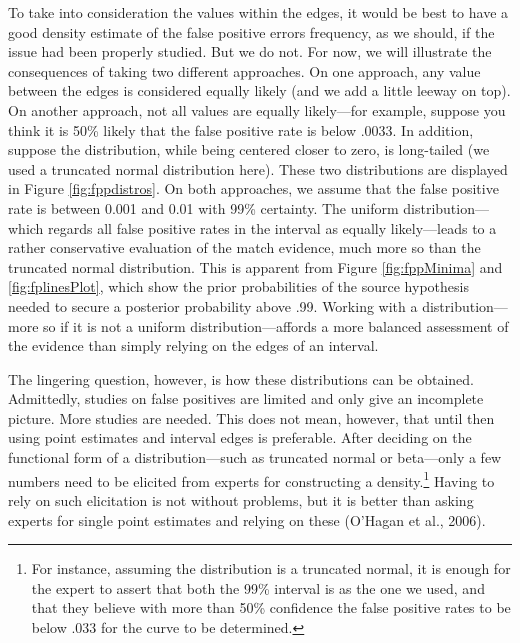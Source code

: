 \documentclass[
  10pt,
  dvipsnames,enabledeprecatedfontcommands]{scrartcl}
\begin{document}
To take into consideration the values within the edges, it would be best
to have a good density estimate of the false positive errors frequency,
as we should, if the issue had been properly studied. But we do not. For
now, we will illustrate the consequences of taking two different
approaches. On one approach, any value between the edges is considered
equally likely (and we add a little leeway on top). On another approach,
not all values are equally likely---for example, suppose you think it is
50\% likely that the false positive rate is below .0033. In addition,
suppose the distribution, while being centered closer to zero, is
long-tailed (we used a truncated normal distribution here). These two
distributions are displayed in Figure \ref{fig:fppdistros}. On both
approaches, we assume that the false positive rate is between 0.001 and
0.01 with 99\% certainty. The uniform distribution---which regards all
false positive rates in the interval as equally likely---leads to a
rather conservative evaluation of the match evidence, much more so than
the truncated normal distribution. This is apparent from Figure
\ref{fig:fppMinima} and \ref{fig:fplinesPlot}, which show the prior
probabilities of the source hypothesis needed to secure a posterior
probability above .99. Working with a distribution---more so if it is
not a uniform distribution---affords a more balanced assessment of the
evidence than simply relying on the edges of an interval.

The lingering question, however, is how these distributions can be
obtained. Admittedly, studies on false positives are limited and only
give an incomplete picture. More studies are needed. This does not mean,
however, that until then using point estimates and interval edges is
preferable. After deciding on the functional form of a
distribution---such as truncated normal or beta---only a few numbers
need to be elicited from experts for constructing a density.\footnote{For
  instance, assuming the distribution is a truncated normal, it is
  enough for the expert to assert that both the 99\% interval is as the
  one we used, and that they believe with more than 50\% confidence the
  false positive rates to be below \(.033\) for the curve to be
  determined.} Having to rely on such elicitation is not without
problems, but it is better than asking experts for single point
estimates and relying on these (O'Hagan et al., 2006).
\end{document}
